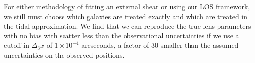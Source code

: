 For either methodology of fitting an external shear or using our LOS framework, we still must choose which galaxies are treated exactly and which are treated in the tidal approximation. We find that we can reproduce the true lens parameters with no bias with scatter less than the observational uncertainties if we use a cutoff in $\Delta_3x$ of $1\times 10^{-4}$ arcseconds, a factor of 30 smaller than the assumed uncertainties on the observed positions.
 